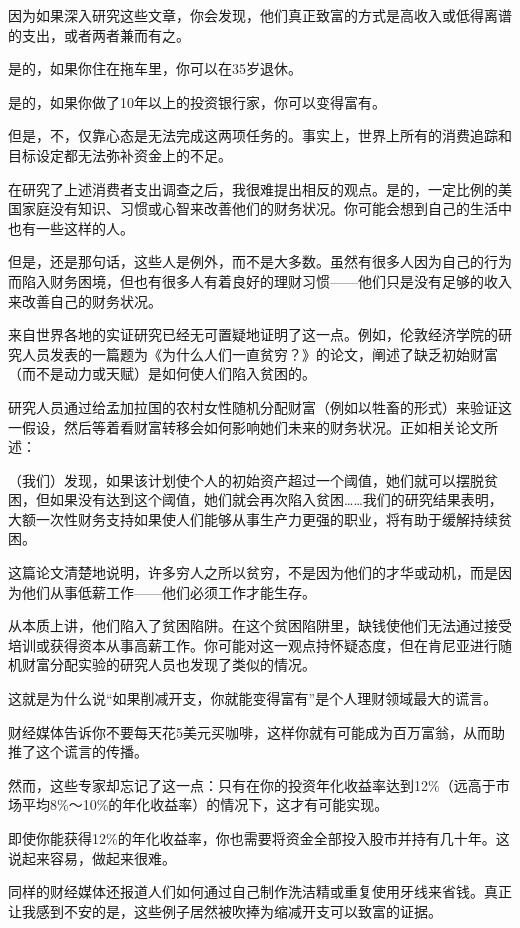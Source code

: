 因为如果深入研究这些文章，你会发现，他们真正致富的方式是高收入或低得离谱的支出，或者两者兼而有之。

是的，如果你住在拖车里，你可以在35岁退休。

是的，如果你做了10年以上的投资银行家，你可以变得富有。

但是，不，仅靠心态是无法完成这两项任务的。事实上，世界上所有的消费追踪和目标设定都无法弥补资金上的不足。

在研究了上述消费者支出调查之后，我很难提出相反的观点。是的，一定比例的美国家庭没有知识、习惯或心智来改善他们的财务状况。你可能会想到自己的生活中也有一些这样的人。

但是，还是那句话，这些人是例外，而不是大多数。虽然有很多人因为自己的行为而陷入财务困境，但也有很多人有着良好的理财习惯——他们只是没有足够的收入来改善自己的财务状况。

来自世界各地的实证研究已经无可置疑地证明了这一点。例如，伦敦经济学院的研究人员发表的一篇题为《为什么人们一直贫穷？》的论文，阐述了缺乏初始财富（而不是动力或天赋）是如何使人们陷入贫困的。

研究人员通过给孟加拉国的农村女性随机分配财富（例如以牲畜的形式）来验证这一假设，然后等着看财富转移会如何影响她们未来的财务状况。正如相关论文所述：

（我们）发现，如果该计划使个人的初始资产超过一个阈值，她们就可以摆脱贫困，但如果没有达到这个阈值，她们就会再次陷入贫困……我们的研究结果表明，大额一次性财务支持如果使人们能够从事生产力更强的职业，将有助于缓解持续贫困。

这篇论文清楚地说明，许多穷人之所以贫穷，不是因为他们的才华或动机，而是因为他们从事低薪工作——他们必须工作才能生存。

从本质上讲，他们陷入了贫困陷阱。在这个贫困陷阱里，缺钱使他们无法通过接受培训或获得资本从事高薪工作。你可能对这一观点持怀疑态度，但在肯尼亚进行随机财富分配实验的研究人员也发现了类似的情况。

这就是为什么说“如果削减开支，你就能变得富有”是个人理财领域最大的谎言。

财经媒体告诉你不要每天花5美元买咖啡，这样你就有可能成为百万富翁，从而助推了这个谎言的传播。

然而，这些专家却忘记了这一点：只有在你的投资年化收益率达到12\%（远高于市场平均8\%～10\%的年化收益率）的情况下，这才有可能实现。

即使你能获得12\%的年化收益率，你也需要将资金全部投入股市并持有几十年。这说起来容易，做起来很难。

同样的财经媒体还报道人们如何通过自己制作洗洁精或重复使用牙线来省钱。真正让我感到不安的是，这些例子居然被吹捧为缩减开支可以致富的证据。

